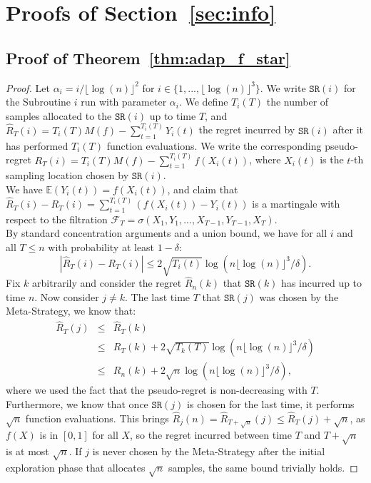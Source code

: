 \documentclass[final,12pt]{colt2018}
\newcommand{\floor}[1]{\lfloor #1 \rfloor}
\begin{document}
\section{Proofs of Section~\ref{sec:info}}
\subsection{Proof of Theorem~\ref{thm:adap_f_star}}
\begin{proof}
Let $\alpha_i = i/\floor{\log(n)}^2$ for $i \in \{1,..., \floor{\log(n)}^3\}$. We write $\texttt{SR}(i)$ for the Subroutine $i$ run with parameter $\alpha_i$. We define $T_i(T)$ the number of samples allocated to the $\texttt{SR}(i)$ up to time $T$, and $\widehat{R}_T(i) = T_i(T)M(f) - \sum_{t=1}^{T_i(T)} Y_i(t)$ the regret incurred by $\texttt{SR}(i)$ after it has performed $T_i(T)$ function evaluations. We write the corresponding pseudo-regret $R_T(i) = T_i(T)M(f) - \sum_{t=1}^{T_i(T)} f(X_i(t))$, where $X_i(t)$ is the $t$-th sampling location chosen by $\texttt{SR}(i)$.\\

We have $\mathbb E(Y_i(t)) = f(X_i(t))$, and claim that $\widehat{R}_T(i) - R_T(i) = \sum_{t=1}^{T_i(T)} \left(f(X_i(t)) - Y_i(t) \right)$ is a martingale with respect to the filtration $\mathcal F_T = \sigma(X_1, Y_1, ..., X_{T-1}, Y_{T-1}, X_T) $.\\
By standard concentration arguments and a union bound, we have for all $i$ and all $T \leq n$ with probability at least $1-\delta$: 
$$
|\widehat{R}_T(i) - R_T(i)| \leq 2\sqrt{T_i(t)}\log(n\floor{\log(n)}^3/\delta).
$$
Fix $k$ arbitrarily and consider the regret $\widehat{R}_n(k)$ that $\texttt{SR}(k)$ has incurred up to time $n$. Now consider $j \neq k$. The last time $T$ that $\texttt{SR}(j)$ was chosen by the Meta-Strategy, we know that:
\begin{eqnarray*}
\widehat{R}_{T}(j) & \leq & \widehat{R}_{T}(k)\\
& \leq & R_T(k) + 2\sqrt{T_k(T)}\log(n\floor{\log(n)}^3/\delta)\\
& \leq & R_n(k) + 2\sqrt{n}\log(n\floor{\log(n)}^3/\delta),
\end{eqnarray*}
where we used the fact that the pseudo-regret is non-decreasing with $T$. Furthermore, we know that once $\texttt{SR}(j)$ is chosen for the last time, it performs $\sqrt{n}$ function evaluations. This brings $\widehat{R}_j(n) = \widehat{R}_{T+\sqrt{n}}(j) \leq \widehat{R}_T(j) + \sqrt{n}$, as $f(X)$ is in $[0,1]$ for all $X$, so the regret incurred between time $T$ and $T+\sqrt{n}$ is at most $\sqrt{n}$. If $j$ is never chosen by the Meta-Strategy after the initial exploration phase that allocates $\sqrt{n}$ samples, the same bound trivially holds.


\end{proof}
\end{document}
